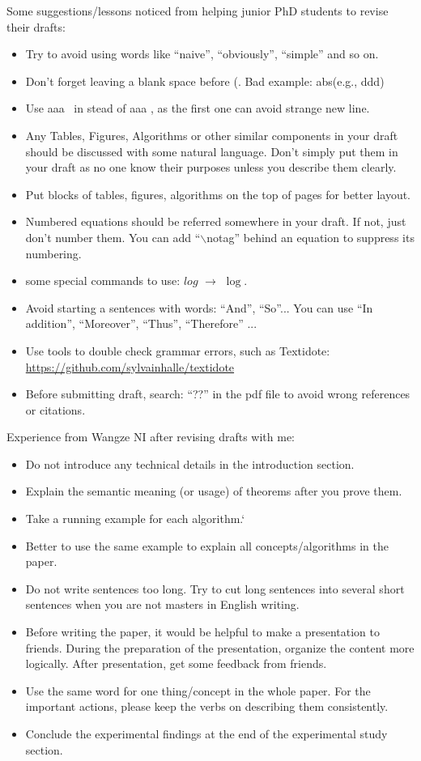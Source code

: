 Some suggestions/lessons noticed from helping junior PhD students to revise their drafts:
\begin{itemize}[leftmargin=*]
	\item Try to avoid using words like ``naive'', ``obviously'', ``simple'' and so on. 
	\item Don't forget leaving a blank space before (. Bad example: abs(e.g., ddd)
	\item Use aaa~\cite{cheng2016task} in stead of aaa \cite{cheng2016task}, as the first one can avoid strange
    \cite{cheng2016task} new line.
	\item Any Tables, Figures, Algorithms or other similar components in your draft should be discussed with some natural language. Don't simply put them in your draft as no one know their purposes unless you describe them clearly. 
	\item Put blocks of tables, figures, algorithms on the top of pages for better layout. 
	\item Numbered equations should be referred somewhere in your draft. If not, just don't number them. You can add ``$\backslash$notag'' behind an equation to suppress its numbering.
	\item some special commands to use: $log$ $\longrightarrow$ $\log$.
	\item Avoid starting a sentences with words: ``And'', ``So''... You can use ``In addition'', ``Moreover'', ``Thus'', ``Therefore'' ...
	\item Use tools to double check grammar errors, such as Textidote: \url{https://github.com/sylvainhalle/textidote}
	\item Before submitting draft, search: ``??'' in the pdf file to avoid wrong references or citations.
\end{itemize} 

Experience from Wangze NI after revising drafts with me:
\begin{itemize}
\item Do not introduce any technical details in the introduction section.
\item Explain the semantic meaning (or usage) of theorems after you prove them.
\item Take a running example for each algorithm.`
\item Better to use the same example to explain all concepts/algorithms in the paper.
\item Do not write sentences too long. Try to cut long sentences into several short sentences when you are not masters in English writing.
\item Before writing the paper, it would be helpful to make a presentation to friends. During the preparation of the presentation, organize the content more logically. After presentation, get some feedback from friends.
\item Use the same word for one thing/concept in the whole paper. For the important actions, please keep the verbs on describing them consistently.
\item Conclude the experimental findings at the end of the experimental study section.
\end{itemize}
